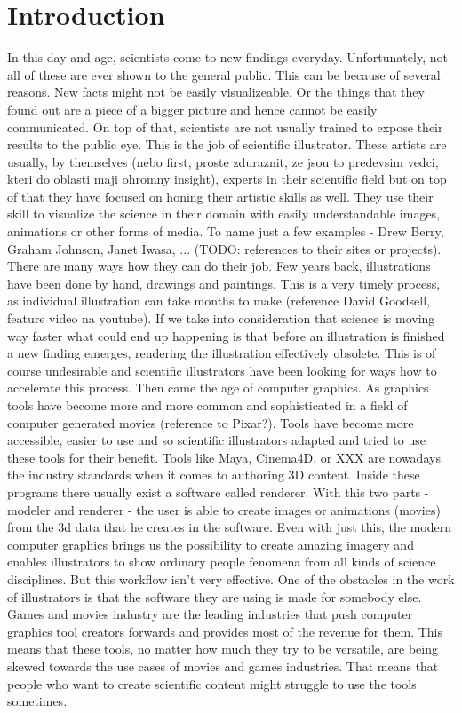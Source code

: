 \documentclass[
  digital, %
  table,   %
  lof,     %
  lot,     %
]{fithesis3}
\begin{document}
\chapter{Introduction}
In this day and age, scientists come to new findings everyday. Unfortunately, not all of these are ever shown to the general public. This can be because of several reasons. New facts might not be easily visualizeable. Or the things that they found out are a piece of a bigger picture and hence cannot be easily communicated. On top of that, scientists are not usually trained to expose their results to the public eye.
This is the job of scientific illustrator. These artists are usually, by themselves (nebo first, proste zduraznit, ze jsou to predevsim vedci, kteri do oblasti maji ohromny insight), experts in their scientific field but on top of that they have focused on honing their artistic skills as well. They use their skill to visualize the science in their domain with easily understandable images, animations or other forms of media. To name just a few examples - Drew Berry, Graham Johnson, Janet Iwasa, ... (TODO: references to their sites or projects).
There are many ways how they can do their job. Few years back, illustrations have been done by hand, drawings and paintings. This is a very timely process, as individual illustration can take months to make (reference David Goodsell, feature video na youtube). If we take into consideration that science is moving way faster what could end up happening is that before an illustration is finished a new finding emerges, rendering the illustration effectively obsolete. This is of course undesirable and scientific illustrators have been looking for ways how to accelerate this process.
Then came the age of computer graphics. As graphics tools have become more and more common and sophisticated in a field of computer generated movies (reference to Pixar?). Tools have become more accessible, easier to use and so scientific illustrators adapted and tried to use these tools for their benefit. Tools like Maya, Cinema4D, or XXX are nowadays the industry standards when it comes to authoring 3D content. Inside these programs there usually exist a software called renderer. With this two parts - modeler and renderer - the user is able to create images or animations (movies) from the 3d data that he creates in the software.
Even with just this, the modern computer graphics brings us the possibility to create amazing imagery and enables illustrators to show ordinary people fenomena from all kinds of science disciplines.
But this workflow isn't very effective. One of the obstacles in the work of illustrators is that the software they are using is made for somebody else. Games and movies industry are the leading industries that push computer graphics tool creators forwards and provides most of the revenue for them. This means that these tools, no matter how much they try to be versatile, are being skewed towards the use cases of movies and games industries. That means that people who want to create scientific content might struggle to use the tools sometimes.
\end{document}

